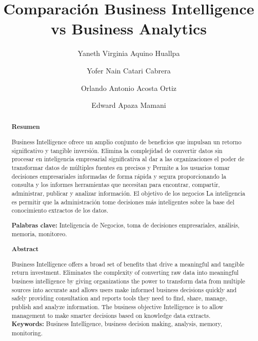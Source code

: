 \documentclass[%
 reprint,
 amsmath,amssymb,
 aps,
]{revtex4-1}
\begin{document}
\title{Comparación Business Intelligence vs Business Analytics}
\author{Yaneth Virginia Aquino Huallpa}
\author{Yofer Nain Catari Cabrera}
\author{Orlando Antonio Acosta Ortiz}
\author{Edward Apaza Mamani}

%

\begin{abstract}
\begin{center}
\textbf{Resumen}
\end{center}

Business Intelligence ofrece un amplio conjunto de beneficios que impulsan un retorno significativo y tangible
inversión. Elimina la complejidad de convertir datos sin procesar en inteligencia empresarial significativa al dar a las organizaciones el poder de transformar datos de múltiples fuentes en precisos y Permite a los usuarios
tomar decisiones empresariales informadas de forma rápida y segura proporcionando la consulta y los informes
herramientas que necesitan para encontrar, compartir, administrar, publicar y analizar información. El objetivo de los negocios
La inteligencia es permitir que la administración tome decisiones más inteligentes sobre la base del conocimiento
extractos de los datos.

\textbf{Palabras clave:}  Inteligencia de Negocios, toma de decisiones empresariales, análisis, memoria, monitoreo.\\
\begin{center}
\textbf{Abstract}
\end{center}
Business Intelligence offers a broad set of benefits that drive a meaningful and tangible return
investment. Eliminates the complexity of converting raw data into meaningful business intelligence by giving organizations the power to transform data from multiple sources into accurate and allows users
make informed business decisions quickly and safely providing consultation and reports
tools they need to find, share, manage, publish and analyze information. The business objective
Intelligence is to allow management to make smarter decisions based on knowledge
data extracts.
\\

\textbf{Keywords:}  Business Intelligence, business decision making, analysis, memory, monitoring.\\
\end{abstract}

\maketitle
\end{document}
